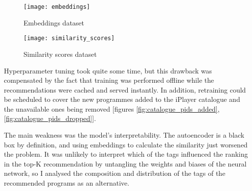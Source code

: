 \begin{figure}[H]
  \centering
  \texttt{[image: embeddings]}
  \caption{Embeddings dataset}
  \label{fig:embeddings}
\end{figure}

\begin{figure}[H]
  \centering
  \texttt{[image: similarity\_scores]}
  \caption{Similarity scores dataset}
  \label{fig:similarity_scores}
\end{figure}

Hyperparameter tuning took quite some time, but this drawback was compensated by the fact that training was performed offline
while the recommendations were cached and served instantly.
In addition, retraining could be scheduled to cover the new programmes added to the iPlayer catalogue and the unavailable ones being removed
[figures \ref{fig:catalogue_pids_added}, \ref{fig:catalogue_pids_dropped}].

The main weakness was the model's interpretability.
The autoencoder is a black box by definition, and using embeddings to calculate the similarity just worsened the problem.
It was unlikely to interpret which of the tags influenced the ranking in the top-K recommendation by untangling the weights and biases of the neural network,
so I analysed the composition and distribution of the tags of the recommended programs as an alternative.
